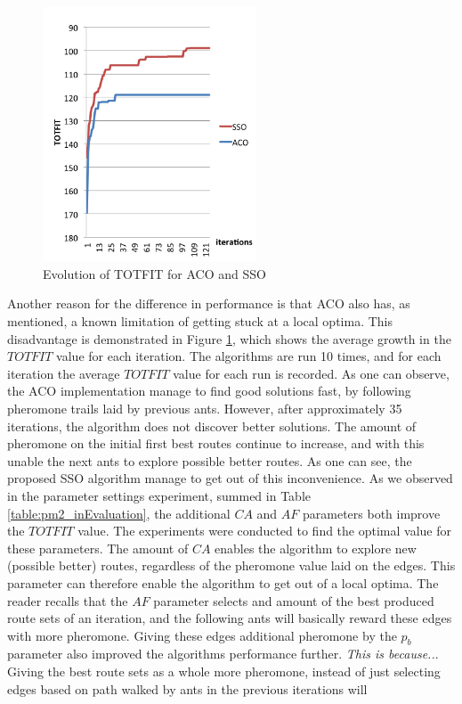  \begin{figure}[H]
    \begin{center}
    \includegraphics[width=2.5in]{assets/acovsssoNEW.png}
    \end{center}
    \caption{Evolution of TOTFIT for ACO and SSO }
    \label{fig:acovssso} 
\end{figure}

Another reason for the difference in performance is that ACO also has, as mentioned, a known limitation of getting stuck at a local optima. This disadvantage is demonstrated in Figure \ref{fig:acovssso}, which shows the average growth in the $TOTFIT$ value for each iteration. The algorithms are run 10 times, and for each iteration the average $TOTFIT$ value for each run is recorded. As one can observe, the ACO implementation manage to find good solutions fast, by following pheromone trails laid by previous ants. However, after approximately 35 iterations, the algorithm does not discover better solutions. The amount of pheromone on the initial first best routes continue to increase, and with this unable the next ants to explore possible better routes. As one can see, the proposed SSO algorithm manage to get out of this inconvenience. As we observed in the parameter settings experiment, summed in Table \vref{table:pm2_inEvaluation}, the additional $CA$ and $AF$ parameters both improve the $TOTFIT$ value. The experiments were conducted to find the optimal value for these parameters. %
The amount of $CA$ enables the algorithm to explore new (possible better) routes, regardless of the pheromone value laid on the edges. This parameter can therefore enable the algorithm to get out of a local optima. The reader recalls that the $AF$ parameter selects and amount of the best produced route sets of an iteration, and the following ants will basically reward these edges with more pheromone. Giving these edges additional pheromone by the $p_b$ parameter also improved the algorithms performance further. \emph{\color{blue}This is because..}. Giving the best route sets as a whole more pheromone, instead of just selecting edges based on path walked by ants in the previous iterations will 

